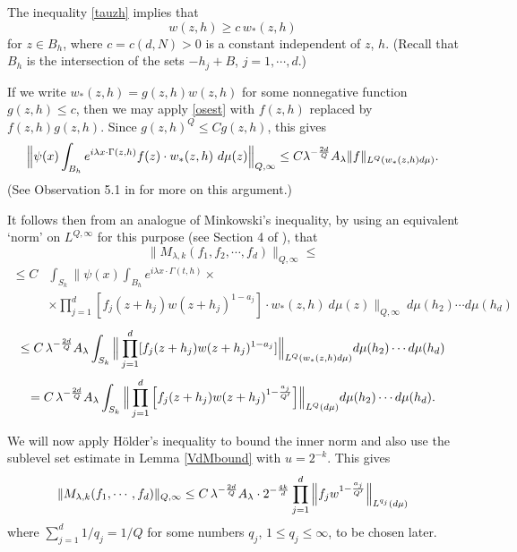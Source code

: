 \documentclass[11 pt]{amsart}
\theoremstyle{plain}
\numberwithin{equation}{section}
\theoremstyle{plain}
\numberwithin{equation}{section}
\theoremstyle{remark}
\begin{document}
The inequality \eqref{tauzh} implies that
\begin{equation}\label{ostor}
w(z,h) \ge c \, w_*(z,h)
\end{equation}
for $z \in B_h$, where $c = c(d,N) >0$ is a constant independent of $z$, $h$.
(Recall that $B_h$ is the intersection of the sets $- h_j + B$, $j=1, \cdots, d$.)

If we write $w_* (z,h) = g(z,h) w(z,h)$ for some nonnegative function $g(z,h) \le c$, then
we may apply \eqref{osest} with $f(z,h)$ replaced by $f(z,h) g(z,h)$. Since $g(z,h)^Q \le C g(z,h)$, this gives
\begin{equation*}\label{}
\Big\| \psi(x) \int_{B_h} e^{i{\lambda} x\cdot \Gamma(z,h)}
f(z) \cdot w_*(z, h) \ d\mu(z) \Big\|_{Q,\infty} \le C {\lambda}^{-{2d\over Q}}
A_{\lambda} \| f \|_{L^Q (w_*(z, h) d\mu )} .
\end{equation*}
(See Observation 5.1 in \cite{BOS3} for more on this argument.)

It follows then from an analogue of Minkowski's inequality, by using an equivalent `norm' on $L^{Q,\infty}$ for this purpose (see Section 4 of \cite{BOS3}), that
\begin{equation*}\label{}
\| M_{{\lambda}, k} (f_1, f_2,\cdots, f_d)\|_{Q,\infty} \le
\end{equation*}
\begin{align*}\label{}
\le C &\int_{S_k} \Big\| \psi(x) \int_{B_h} e^{i {\lambda}
x\cdot
\Gamma(t,h)} \times \\
&\times \prod_{j=1}^d [f_j(z + h_j) w(z + h_j)^{1- a_j}] \cdot
w_*(z,h) \ d\mu(z) \Big\|_{Q,\infty} \ d\mu(h_2) \cdots d\mu(h_d)
\end{align*}
\begin{equation*}\label{}
\le C \, {\lambda}^{-{2d\over Q}} A_{\lambda} \int_{S_k} \Big\| \prod_{j=1}^d [f_j(z +
h_j) w(z + h_j)^{1- a_j}] \Big\|_{L^Q (w_* (z,h) d\mu )} d\mu(h_2)
\cdots d\mu(h_d)
\end{equation*}
\begin{equation*}\label{}
= C \, {\lambda}^{-{2d\over Q}} A_{\lambda} \int_{S_k} \Big\| \prod_{j=1}^d \Big[ f_j(z+
h_j) w(z + h_j)^{1- {a_j\over Q'}} \Big] \Big\|_{L^Q (d\mu )} d\mu(h_2)
\cdots d\mu(h_d) .
\end{equation*}

We will now apply H\"older's inequality to bound the inner norm and also use the sublevel set estimate in Lemma \ref{VdMbound} with $u=2^{-k}$.
This gives
\begin{equation}\label{Eq}
\| M_{{\lambda}, k} (f_1, \cdots, f_d)\|_{Q,\infty} \le C\, {\lambda}^{-{2d\over Q}}
A_{\lambda} \cdot 2^{-{4k\over d}}  \prod_{j=1}^d \Big\| f_j w^{1- {a_j\over Q'}}
\Big\|_{L^{q_j}(d\mu )}
\end{equation}
where $\sum_{j=1}^d 1/q_j = 1/Q$ for some numbers $q_j$, $1\le q_j\le \infty$, to
be chosen later.
\end{document}
